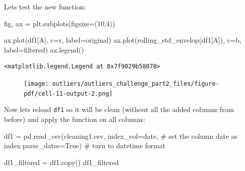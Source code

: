 \documentclass[
  letterpaper,
  DIV=11,
  numbers=noendperiod,
  oneside]{scrreprt}
\newenvironment{Shaded}{\begin{snugshade}}{\end{snugshade}}
\newcommand{\CommentTok}[1]{\textcolor[rgb]{0.37,0.37,0.37}{#1}}
\newcommand{\DecValTok}[1]{\textcolor[rgb]{0.68,0.00,0.00}{#1}}
\newcommand{\NormalTok}[1]{\textcolor[rgb]{0.00,0.23,0.31}{#1}}
\newcommand{\OperatorTok}[1]{\textcolor[rgb]{0.37,0.37,0.37}{#1}}
\newcommand{\StringTok}[1]{\textcolor[rgb]{0.13,0.47,0.30}{#1}}
\newcommand{\VariableTok}[1]{\textcolor[rgb]{0.07,0.07,0.07}{#1}}
\begin{document}
Lets test the new function:

\begin{Shaded}
\begin{Highlighting}[]
\NormalTok{fig, ax }\OperatorTok{=}\NormalTok{ plt.subplots(figsize}\OperatorTok{=}\NormalTok{(}\DecValTok{10}\NormalTok{,}\DecValTok{4}\NormalTok{))}

\NormalTok{ax.plot(df1[}\StringTok{\textquotesingle{}A\textquotesingle{}}\NormalTok{], c}\OperatorTok{=}\StringTok{\textquotesingle{}r\textquotesingle{}}\NormalTok{, label}\OperatorTok{=}\StringTok{\textquotesingle{}original\textquotesingle{}}\NormalTok{)}
\NormalTok{ax.plot(rolling\_std\_envelop(df1[}\StringTok{\textquotesingle{}A\textquotesingle{}}\NormalTok{]), c}\OperatorTok{=}\StringTok{\textquotesingle{}b\textquotesingle{}}\NormalTok{, label}\OperatorTok{=}\StringTok{\textquotesingle{}filtered\textquotesingle{}}\NormalTok{)}
\NormalTok{ax.legend()}
\end{Highlighting}
\end{Shaded}

\begin{verbatim}
<matplotlib.legend.Legend at 0x7f9029b58070>
\end{verbatim}

\begin{figure}[H]

{\centering \texttt{[image: outliers/outliers\_challenge\_part2\_files/figure-pdf/cell-11-output-2.png]}

}

\end{figure}

Now lets reload \texttt{df1} so it will be clean (without all the added
columns from before) and apply the function on all columns:

\begin{Shaded}
\begin{Highlighting}[]
\NormalTok{df1 }\OperatorTok{=}\NormalTok{ pd.read\_csv(}\StringTok{\textquotesingle{}cleaning1.csv\textquotesingle{}}\NormalTok{, }
\NormalTok{                  index\_col}\OperatorTok{=}\StringTok{\textquotesingle{}date\textquotesingle{}}\NormalTok{,     }\CommentTok{\# set the column date as index }
\NormalTok{                  parse\_dates}\OperatorTok{=}\VariableTok{True}\NormalTok{)     }\CommentTok{\# turn to datetime format}
\end{Highlighting}
\end{Shaded}

\begin{Shaded}
\begin{Highlighting}[]
\NormalTok{df1\_filtered }\OperatorTok{=}\NormalTok{ df1.copy()}
\NormalTok{df1\_filtered}
\end{Highlighting}
\end{Shaded}
\end{document}
